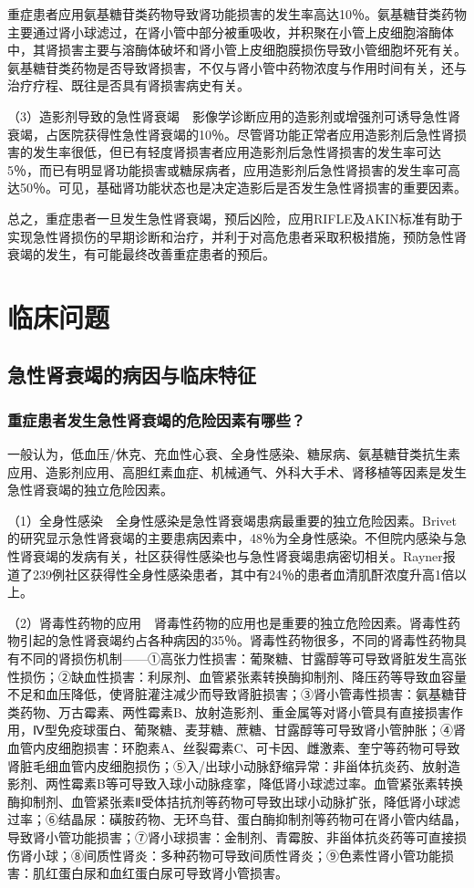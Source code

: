 重症患者应用氨基糖苷类药物导致肾功能损害的发生率高达10％。氨基糖苷类药物主要通过肾小球滤过，在肾小管中部分被重吸收，并积聚在小管上皮细胞溶酶体中，其肾损害主要与溶酶体破坏和肾小管上皮细胞膜损伤导致小管细胞坏死有关。氨基糖苷类药物是否导致肾损害，不仅与肾小管中药物浓度与作用时间有关，还与治疗疗程、既往是否具有肾损害病史有关。

（3）造影剂导致的急性肾衰竭　影像学诊断应用的造影剂或增强剂可诱导急性肾衰竭，占医院获得性急性肾衰竭的10％。尽管肾功能正常者应用造影剂后急性肾损害的发生率很低，但已有轻度肾损害者应用造影剂后急性肾损害的发生率可达5％，而已有明显肾功能损害或糖尿病者，应用造影剂后急性肾损害的发生率可高达50％。可见，基础肾功能状态也是决定造影后是否发生急性肾损害的重要因素。

总之，重症患者一旦发生急性肾衰竭，预后凶险，应用RIFLE及AKIN标准有助于实现急性肾损伤的早期诊断和治疗，并利于对高危患者采取积极措施，预防急性肾衰竭的发生，有可能最终改善重症患者的预后。

\section{临床问题}

\subsection{急性肾衰竭的病因与临床特征}

\subsubsection{重症患者发生急性肾衰竭的危险因素有哪些？}

一般认为，低血压/休克、充血性心衰、全身性感染、糖尿病、氨基糖苷类抗生素应用、造影剂应用、高胆红素血症、机械通气、外科大手术、肾移植等因素是发生急性肾衰竭的独立危险因素。

（1）全身性感染　全身性感染是急性肾衰竭患病最重要的独立危险因素。Brivet的研究显示急性肾衰竭的主要患病因素中，48％为全身性感染。不但院内感染与急性肾衰竭的发病有关，社区获得性感染也与急性肾衰竭患病密切相关。Rayner报道了239例社区获得性全身性感染患者，其中有24％的患者血清肌酐浓度升高1倍以上。

（2）肾毒性药物的应用　肾毒性药物的应用也是重要的独立危险因素。肾毒性药物引起的急性肾衰竭约占各种病因的35％。肾毒性药物很多，不同的肾毒性药物具有不同的肾损伤机制------①高张力性损害：葡聚糖、甘露醇等可导致肾脏发生高张性损伤；②缺血性损害：利尿剂、血管紧张素转换酶抑制剂、降压药等导致血容量不足和血压降低，使肾脏灌注减少而导致肾脏损害；③肾小管毒性损害：氨基糖苷类药物、万古霉素、两性霉素B、放射造影剂、重金属等对肾小管具有直接损害作用，Ⅳ型免疫球蛋白、葡聚糖、麦芽糖、蔗糖、甘露醇等可导致肾小管肿胀；④肾血管内皮细胞损害：环胞素A、丝裂霉素C、可卡因、雌激素、奎宁等药物可导致肾脏毛细血管内皮细胞损伤；⑤入/出球小动脉舒缩异常：非甾体抗炎药、放射造影剂、两性霉素B等可导致入球小动脉痉挛，降低肾小球滤过率。血管紧张素转换酶抑制剂、血管紧张素Ⅱ受体拮抗剂等药物可导致出球小动脉扩张，降低肾小球滤过率；⑥结晶尿：磺胺药物、无环鸟苷、蛋白酶抑制剂等药物可在肾小管内结晶，导致肾小管功能损害；⑦肾小球损害：金制剂、青霉胺、非甾体抗炎药等可直接损伤肾小球；⑧间质性肾炎：多种药物可导致间质性肾炎；⑨色素性肾小管功能损害：肌红蛋白尿和血红蛋白尿可导致肾小管损害。

